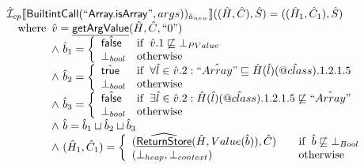 \documentclass{article}
\makeatletter
\newcommand{\SF}[1]{\mbox{\textsf{#1}}}
\newcommand{\wherec}[1]{{\rm where}\begin{array}[t]{l}#1\end{array}}
\newcommand{\ifc}[1]{{\rm if}\begin{array}[t]{l}#1\end{array}}
\newcommand{\owc}{{\rm otherwise}}
\newcommand{\aI}{\hat{\mathcal{I}}}
\newcommand{\lbr}{\llbracket}
\newcommand{\rbr}{\rrbracket}
\newcommand{\hf}[1]{\underline{\sf #1}}
\newcommand{\ahf}[1]{\widehat{\underline{\sf #1}}}
\newcommand{\avarprop}[1]{\hat{@#1}}
\newcommand{\atrue}{\hat{\SF{true}}}
\newcommand{\afalse}{\hat{\SF{false}}}
\makeatother
\begin{document}
\[\begin{array}{l}
\aI _{cp}\lbr \SF{BuiltintCall}(``\SF{Array.isArray}",args))_{\hat{a}_{new}}\rbr((\hat{H},\hat{C}), \hat{S})
  = ((\hat{H}_1, \hat{C}_1), \hat{S})\\
\quad\wherec{
  \hat{v} = \hf{getArgValue}(\hat{H}, \hat{C}, ``0")\\
  \land\ \hat{b}_1 = \left\{\begin{array}{ll}
      \afalse & \ifc{\hat{v}.1 \not\sqsubseteq \bot_{PValue}}\\
      \bot_{bool}& \owc
    \end{array}\right.\\
  \land\ \hat{b}_2 = \left\{\begin{array}{ll}
      \atrue & \ifc{\forall \hat{l} \in \hat{v}.2 : \hat{``Array"} \sqsubseteq \hat{H}(\hat{l})(\avarprop{class}).1.2.1.5}\\
      \bot_{bool}& \owc
    \end{array}\right.\\
  \land\ \hat{b}_3 = \left\{\begin{array}{ll}
      \afalse & \ifc{\exists\hat{l} \in \hat{v}.2 : \hat{H}(\hat{l})(\avarprop{class}).1.2.1.5 \not\sqsubseteq \hat{``Array"} }\\
      \bot_{bool}& \owc
    \end{array}\right.\\
  \land\ \hat{b} = \hat{b}_1 \sqcup \hat{b}_2 \sqcup \hat{b}_3\\
  \land\ (\hat{H}_1, \hat{C}_1) = 
    \left\{\begin{array}{l@{\quad\quad}l}
      (\ahf{ReturnStore}(\hat{H}, Value(\hat{b})), \hat{C})
      & \ifc{\hat{b} \not\sqsubseteq \bot_{Bool}}\\
      (\bot_{heap}, \bot_{context}) & \owc \\
    \end{array}\right.\\
  }\\	
\\\\


\end{array}
\]
\end{document}

